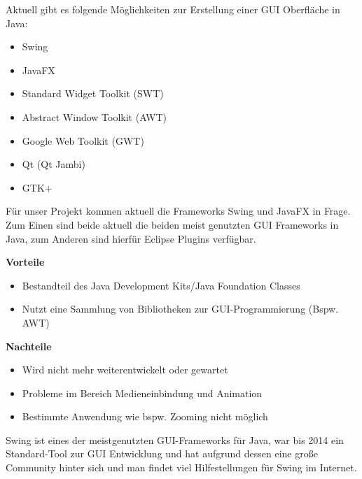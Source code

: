 Aktuell gibt es folgende Möglichkeiten zur Erstellung einer GUI Oberfläche in Java:
 \begin{itemize}
	\item Swing
	\item JavaFX
	\item Standard Widget Toolkit (SWT)
	\item Abstract Window Toolkit (AWT)
	\item Google Web Toolkit (GWT)
	\item Qt (Qt Jambi)
	\item GTK+
\end{itemize}
\nsecend %

Für unser Projekt kommen aktuell die Frameworks Swing und JavaFX in Frage. Zum Einen sind beide aktuell die beiden meist genutzten GUI Frameworks in Java, zum Anderen sind hierfür Eclipse Plugins verfügbar.
\nsecend %



\textbf{Vorteile}
\begin{itemize}
	\item Bestandteil des Java Development Kits/Java Foundation Classes
	\item Nutzt eine Sammlung von Bibliotheken zur GUI-Programmierung (Bspw. AWT)
\end{itemize}


\textbf{Nachteile}
\begin{itemize}
	\item Wird nicht mehr weiterentwickelt oder gewartet
	\item Probleme im Bereich Medieneinbindung und Animation
	\item Bestimmte Anwendung wie bspw. Zooming nicht möglich
\end{itemize}

Swing ist eines der meistgenutzten GUI-Frameworks für Java, war bis 2014 ein Standard-Tool zur GUI Entwicklung und hat aufgrund dessen eine große Community hinter sich und man findet viel Hilfestellungen für Swing im Internet.

